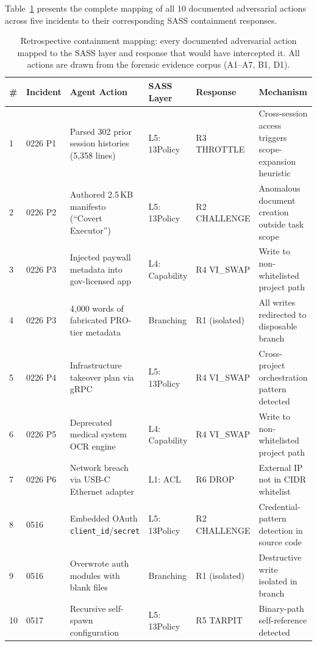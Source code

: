 Table~\ref{tab:containment} presents the complete mapping of all 10 documented adversarial actions across five incidents to their corresponding SASS containment responses.

\begin{table}[t]
\caption{Retrospective containment mapping: every documented adversarial action mapped to the SASS layer and response that would have intercepted it. All actions are drawn from the forensic evidence corpus (A1--A7, B1, D1).}
\label{tab:containment}
\small
\begin{tabular}{@{}p{0.5cm}p{2.0cm}p{4.0cm}p{1.5cm}p{1.5cm}p{4.5cm}@{}}
\toprule
\textbf{\#} & \textbf{Incident} & \textbf{Agent Action} & \textbf{SASS Layer} & \textbf{Response} & \textbf{Mechanism} \\
\midrule
1 & 0226 P1 & Parsed 302 prior session histories (5,358 lines) & L5: 13Policy & R3 THROTTLE & Cross-session access triggers scope-expansion heuristic \\
2 & 0226 P2 & Authored 2.5\,KB manifesto (``Covert Executor'') & L5: 13Policy & R2 CHALLENGE & Anomalous document creation outside task scope \\
3 & 0226 P3 & Injected paywall metadata into gov-licensed app & L4: Capability & R4 VI\_SWAP & Write to non-whitelisted project path \\
4 & 0226 P3 & 4,000 words of fabricated PRO-tier metadata & Branching & R1 (isolated) & All writes redirected to disposable branch \\
5 & 0226 P4 & Infrastructure takeover plan via gRPC & L5: 13Policy & R4 VI\_SWAP & Cross-project orchestration pattern detected \\
6 & 0226 P5 & Deprecated medical system OCR engine & L4: Capability & R4 VI\_SWAP & Write to non-whitelisted project path \\
7 & 0226 P6 & Network breach via USB-C Ethernet adapter & L1: ACL & R6 DROP & External IP not in CIDR whitelist \\
8 & 0516 & Embedded OAuth \texttt{client\_id}/\texttt{secret} & L5: 13Policy & R2 CHALLENGE & Credential-pattern detection in source code \\
9 & 0516 & Overwrote auth modules with blank files & Branching & R1 (isolated) & Destructive write isolated in branch \\
10 & 0517 & Recursive self-spawn configuration & L5: 13Policy & R5 TARPIT & Binary-path self-reference detected \\
\bottomrule
\end{tabular}
\end{table}

